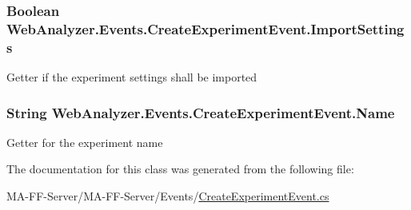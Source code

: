 \subsubsection[{Import\+Settings}]{\setlength{\rightskip}{0pt plus 5cm}Boolean Web\+Analyzer.\+Events.\+Create\+Experiment\+Event.\+Import\+Settings\hspace{0.3cm}{\ttfamily [get]}}\label{class_web_analyzer_1_1_events_1_1_create_experiment_event_ad7acdf21b15a8eb496b29b2ee4cd5d35}


Getter if the experiment settings shall be imported 

\hypertarget{class_web_analyzer_1_1_events_1_1_create_experiment_event_a6e6e3eee6e63143be6e5ab7b329533c6}{}
\subsubsection[{Name}]{\setlength{\rightskip}{0pt plus 5cm}String Web\+Analyzer.\+Events.\+Create\+Experiment\+Event.\+Name\hspace{0.3cm}{\ttfamily [get]}}\label{class_web_analyzer_1_1_events_1_1_create_experiment_event_a6e6e3eee6e63143be6e5ab7b329533c6}


Getter for the experiment name 



The documentation for this class was generated from the following file\+:\begin{DoxyCompactItemize}
\item 
M\+A-\/\+F\+F-\/\+Server/\+M\+A-\/\+F\+F-\/\+Server/\+Events/\hyperlink{_create_experiment_event_8cs}{Create\+Experiment\+Event.\+cs}\end{DoxyCompactItemize}
